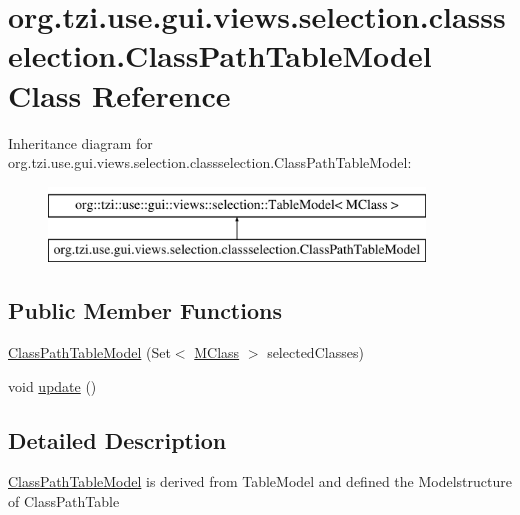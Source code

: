 \hypertarget{classorg_1_1tzi_1_1use_1_1gui_1_1views_1_1selection_1_1classselection_1_1_class_path_table_model}{\section{org.\-tzi.\-use.\-gui.\-views.\-selection.\-classselection.\-Class\-Path\-Table\-Model Class Reference}
\label{classorg_1_1tzi_1_1use_1_1gui_1_1views_1_1selection_1_1classselection_1_1_class_path_table_model}
}
Inheritance diagram for org.\-tzi.\-use.\-gui.\-views.\-selection.\-classselection.\-Class\-Path\-Table\-Model\-:\begin{figure}[H]
\begin{center}
\leavevmode
\includegraphics[height=2.000000cm]{classorg_1_1tzi_1_1use_1_1gui_1_1views_1_1selection_1_1classselection_1_1_class_path_table_model}
\end{center}
\end{figure}
\subsection*{Public Member Functions}
\begin{DoxyCompactItemize}
\item 
\hyperlink{classorg_1_1tzi_1_1use_1_1gui_1_1views_1_1selection_1_1classselection_1_1_class_path_table_model_abdd9508e5a7db19395cf8fe5b2561921}{Class\-Path\-Table\-Model} (Set$<$ \hyperlink{interfaceorg_1_1tzi_1_1use_1_1uml_1_1mm_1_1_m_class}{M\-Class} $>$ selected\-Classes)
\item 
void \hyperlink{classorg_1_1tzi_1_1use_1_1gui_1_1views_1_1selection_1_1classselection_1_1_class_path_table_model_a4083fda5d909b7b52209b6b139ec3531}{update} ()
\end{DoxyCompactItemize}


\subsection{Detailed Description}
\hyperlink{classorg_1_1tzi_1_1use_1_1gui_1_1views_1_1selection_1_1classselection_1_1_class_path_table_model}{Class\-Path\-Table\-Model} is derived from Table\-Model and defined the Modelstructure of Class\-Path\-Table

